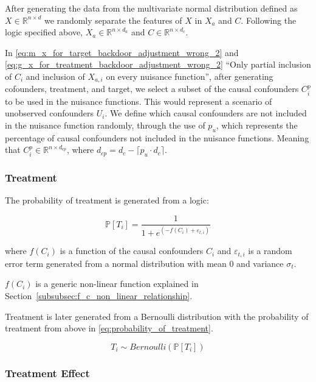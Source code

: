 \documentclass{article}
\numberwithin{equation}{section}
\begin{document}
After generating the data from the multivariate normal distribution defined as $X \in \mathbb{R}^{n \times d}$ we randomly separate the features of $X$ in $X_a$ and $C$. Following the logic specified above, $X_a \in \mathbb{R}^{n \times d_a}$ and $C \in \mathbb{R}^{n \times d_c}$.

In \eqref{eq:m_x_for_target_backdoor_adjustment_wrong_2} and \eqref{eq:g_x_for_treatment_backdoor_adjustment_wrong_2} ``Only partial inclusion of $C_i$ and inclusion of $X_{a, i}$ on every nuisance function'', after generating cofounders, treatment, and target, we select a subset of the causal confounders $C^{p}_i$ to be used in the nuisance functions. This would represent a scenario of unobserved confounders $U_i$. We define which causal confounders are not included in the nuisance function randomly, through the use of $p_u$, which represents the percentage of causal confounders not included in the nuisance functions. Meaning that $C^{p}_i \in \mathbb{R}^{n \times d_{cp}}$, where $d_{cp} = d_c - \lceil p_u \cdot d_c \rceil$.

\subsubsection{Treatment}

The probability of treatment is generated from a logic:

\begin{equation}
    \mathbb{P}[T_i] = \frac{1}{1 + e^{(-f(C_i) + \varepsilon_{t, i})}}
    \label{eq:probability_of_treatment}
\end{equation}

where $f(C_i)$ is a function of the causal confounders $C_i$ and $\varepsilon_{t, i}$ is a random error term generated from a normal distribution with mean 0 and variance $\sigma_{t}$.

$f(C_i)$ is a generic non-linear function explained in Section~\ref{subsubsec:f_c_non_linear_relationship}.

Treatment is later generated from a Bernoulli distribution with the probability of treatment from above in \eqref{eq:probability_of_treatment}.

\begin{equation}
    T_i \sim Bernoulli(\mathbb{P}[T_i])
\end{equation}

\subsubsection{Treatment Effect}
\end{document}
